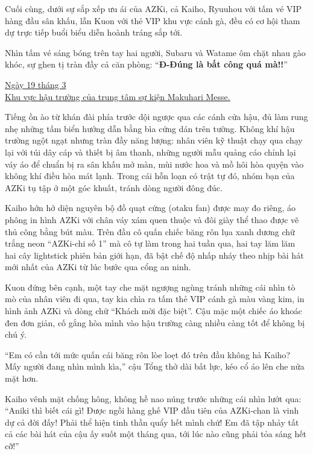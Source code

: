\documentclass[../main.tex]{subfiles}
\begin{document}
Cuối cùng, dưới sự sắp xếp ưu ái của AZKi, cả Kaiho, Ryuuhou với tấm vé VIP hàng đầu sân khấu, lẫn Kuon với thẻ VIP khu vực cánh gà, đều có cơ hội tham dự trực tiếp buổi biểu diễn hoành tráng sắp tới.

Nhìn tấm vé sáng bóng trên tay hai người, Subaru và Watame ôm chặt nhau gào khóc, sự ghen tị tràn đầy cả căn phòng: ``\textbf{Đ-Đúng là bất công quá mà!!}''

\omk

\begin{center}
  \uline{Ngày 19 tháng 3\\Khu vực hậu trường của trung tâm sự kiện Makuhari Messe.}
\end{center}

Tiếng ồn ào từ khán đài phía trước dội ngược qua các cánh cửa hậu, đủ làm rung nhẹ những tấm biển hướng dẫn bằng bìa cứng dán trên tường. Không khí hậu trường ngột ngạt nhưng tràn đầy năng lượng: nhân viên kỹ thuật chạy qua chạy lại với túi dây cáp và thiết bị âm thanh, những người mẫu quảng cáo chỉnh lại váy áo để chuẩn bị ra sân khấu mở màn, mùi nước hoa và mồ hôi hòa quyện vào không khí điều hòa mát lạnh. Trong cái hỗn loạn có trật tự đó, nhóm bạn của AZKi tụ tập ở một góc khuất, tránh dòng người đông đúc.

Kaiho hớn hở diện nguyên bộ đồ quạt cứng (otaku fan) được may đo riêng, áo phông in hình AZKi với chân váy xám quen thuộc và đôi giày thể thao được vẽ thủ công bằng bút màu. Trên đầu cô quấn chiếc băng rôn lụa xanh dương chữ trắng neon ``AZKi-chi số 1'' mà cô tự làm trong hai tuần qua, hai tay lăm lăm hai cây lightstick phiên bản giới hạn, đã bật chế độ nhấp nháy theo nhịp bài hát mới nhất của AZKi từ lúc bước qua cổng an ninh.

Kuon đứng bên cạnh, một tay che mặt ngượng ngùng tránh những cái nhìn tò mò của nhân viên đi qua, tay kia chìa ra tấm thẻ VIP cánh gà màu vàng kim, in hình ảnh AZKi và dòng chữ ``Khách mời đặc biệt''. Cậu mặc một chiếc áo khoác đen đơn giản, cố gắng hòa mình vào hậu trường càng nhiều càng tốt để không bị chú ý.

``Em có cần tới mức quấn cái băng rôn lòe loẹt đó trên đầu không hả Kaiho? Mấy người đang nhìn mình kìa,'' cậu Tổng thở dài bất lực, kéo cổ áo lên che nửa mặt hơn.

Kaiho vênh mặt chống hông, không hề nao núng trước những cái nhìn lướt qua: ``Aniki thì biết cái gì! Được ngồi hàng ghế VIP đầu tiên của AZKi-chan là vinh dự cả đời đấy! Phải thể hiện tinh thần quẩy hết mình chứ! Em đã tập nhảy tất cả các bài hát của cậu ấy suốt một tháng qua, tới lúc nào cũng phải tỏa sáng hết cỡ!''
\end{document}
